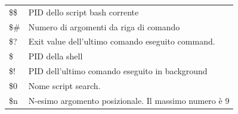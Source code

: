 \documentclass[a4paper]{report}
\begin{document}
\begin{table}[h]
	\centering
	\begin{tabular}{ll}
		\$\$   & PID dello script bash corrente \\
		\$\#   & Numero di argomenti da riga di comando                                                                                                                                                                                                                                                                                                                                                                                                       \\
		\$?    & Exit value dell'ultimo comando eseguito command.                                                                                                                                                                                                                                                                                                                                                                                                       \\
		\$     & PID della shell                                                                                                                                                                                                                                                                                                                                                                                                       \\
		\$!    & PID dell'ultimo comando eseguito in background                                                                                                                                                                                                                                                                                                                                                                                           \\
		\$0    & Nome script search.                                                                                                                                                                                                                                                                                                                                 \\
		\$n    & N-esimo argomento posizionale. Il massimo numero è 9 \\

\end{tabular}
\end{table}
\end{document}
